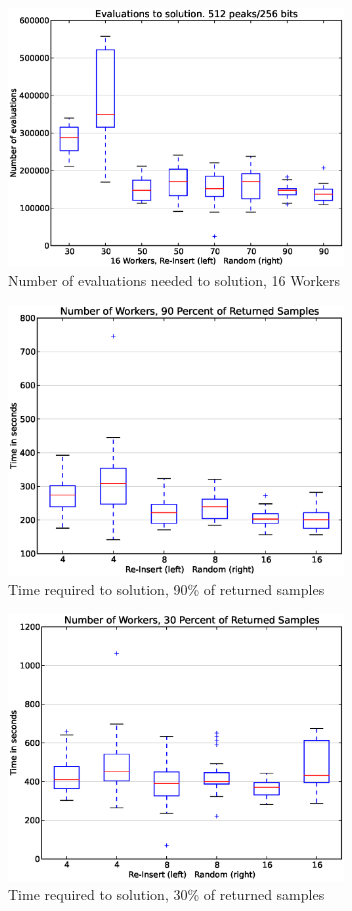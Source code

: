 \documentclass{sig-alternate}
\begin{document}
\begin{figure}[!t]
\centering
\includegraphics[width=3.5in]{eps/16_plot_evals.eps}
\caption{Number of evaluations needed to solution, 16 Workers}
\label{fig:plot_evals_w16}
\end{figure}

\begin{figure}[!t]
\centering
\includegraphics[width=3.5in]{eps/plot_percent_90.eps}
\caption{Time required to solution, 90\% of returned samples}
\label{fig:plot_percent_90}
\end{figure}

\begin{figure}[!t]
\centering
\includegraphics[width=3.5in]{eps/plot_percent_30.eps}
\caption{Time required to solution, 30\% of returned samples}
\label{fig:plot_percent_30}
\end{figure}
\end{document}
